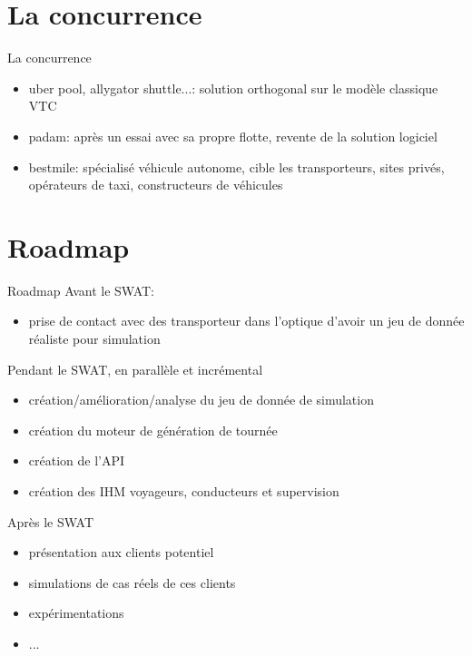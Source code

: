 \documentclass[table]{beamer}
\begin{document}
\section{La concurrence}

\begin{frame}{La concurrence}

  \begin{itemize}
  \item uber pool, allygator shuttle...: solution orthogonal sur le
    modèle classique VTC
  \item padam: après un essai avec sa propre flotte, revente de la
    solution logiciel
  \item bestmile: spécialisé véhicule autonome, cible les
    transporteurs, sites privés, opérateurs de taxi, constructeurs de
    véhicules
  \end{itemize}
\end{frame}

\section{Roadmap}

\begin{frame}{Roadmap}
  Avant le SWAT:
  \begin{itemize}
  \item prise de contact avec des transporteur dans l'optique d'avoir
    un jeu de donnée réaliste pour simulation
  \end{itemize}

  Pendant le SWAT, en parallèle et incrémental
  \begin{itemize}
  \item création/amélioration/analyse du jeu de donnée de simulation
  \item création du moteur de génération de tournée
  \item création de l'API
  \item création des IHM voyageurs, conducteurs et supervision
  \end{itemize}
  
  Après le SWAT
  \begin{itemize}
  \item présentation aux clients potentiel
  \item simulations de cas réels de ces clients
  \item expérimentations
  \item ...
  \end{itemize}
\end{frame}
\end{document}
